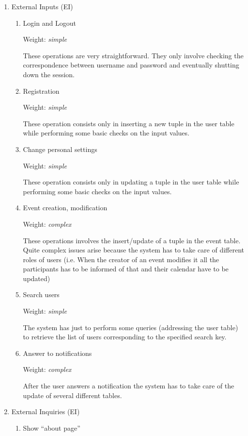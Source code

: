 \documentclass[10pt,a4paper,titlepage]{article}
\begin{document}
\begin{enumerate}
\item External Inputs (EI)
\begin{enumerate}
\item Login and Logout 
 
Weight: \textit{simple}
 
These operations are very straightforward. They only involve checking the correspondence between username and password and eventually shutting down the session. 
 
\item Registration 
 
Weight: \textit{simple}
 
These operation consists only in inserting a new tuple in the user table while performing some basic checks on the input values. 

\item Change personal settings 
 
Weight: \textit{simple}

These operation consists only in updating a tuple in the user table while performing some basic checks on the input values. 
 
\item Event creation, modification

Weight: \textit{complex}

These operations involves the insert/update of a tuple in the event
table. Quite complex issues arise because the system has to take care 
of different roles of users (i.e. When the creator of an event modifies it 
all the participants has to be informed of that and their calendar have to 
be updated) 
 
\item  Search users 
 
Weight: \textit{simple }

The system has just to perform some queries (addressing the user 
table) to retrieve the list of users corresponding to the specified 
search key. 
 
\item Answer to notifications 

Weight: \textit{complex}

After the user answers a notification the system has to take care of the 
update of several different tables. 
\end{enumerate}

\item External Inquiries (EI)
\begin{enumerate}
\item Show ``about page''
 

\end{enumerate}
\end{enumerate}
\end{document}

